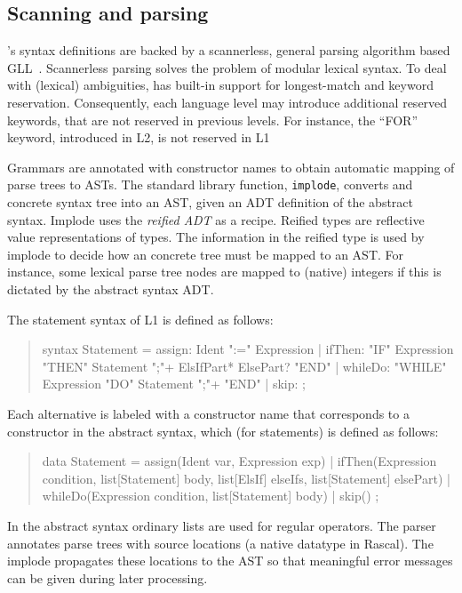 \subsection{Scanning and parsing}

\noindent \Rascal's syntax definitions are backed by a scannerless, general
parsing algorithm based GLL~\cite{JohnstoneScott11}. Scannerless
parsing solves the problem of modular lexical syntax. To deal with
(lexical) ambiguities, \Rascal has built-in support for longest-match
and keyword reservation. Consequently, each language level may
introduce additional reserved keywords, that are not reserved in
previous levels. For instance, the ``FOR'' keyword, introduced in L2,
is not reserved in L1

Grammars are annotated with constructor names to obtain automatic
mapping of parse trees to ASTs. The \Rascal standard library function,
\texttt{implode}, converts and concrete syntax tree into an AST, given
an ADT definition of the abstract syntax. Implode uses the
\textit{reified ADT} as a recipe. Reified types are reflective value
representations of \Rascal types. The information in the reified type
is used by implode to decide how an concrete tree must be mapped to an
AST. For instance, some lexical parse tree nodes are mapped to
(native) integers if this is dictated by the abstract syntax ADT.

The statement syntax of \oberon L1 is defined as follows:
\begin{quote}
\begin{rascal}
syntax Statement 
  = assign: Ident ":=" Expression
  | ifThen: "IF" Expression "THEN" 
               {Statement ";"}+  ElsIfPart* ElsePart? "END"
  | whileDo: "WHILE" Expression "DO" {Statement ";"}+ "END"
  | skip: ;
\end{rascal}
\end{quote}
Each alternative is labeled with a constructor name that corresponds
to a constructor in the abstract syntax, which (for statements) is
defined as follows:
\begin{quote}
\begin{rascal}
data Statement 
  = assign(Ident var, Expression exp)
  | ifThen(Expression condition, list[Statement] body, 
       list[ElsIf] elseIfs, list[Statement] elsePart)
  | whileDo(Expression condition, list[Statement] body)
  | skip()
  ;
\end{rascal}
\end{quote}
In the abstract syntax ordinary \Rascal lists are used for regular
operators.  The \Rascal parser annotates parse trees with source
locations (a native datatype in Rascal). The implode propagates these
locations to the AST so that meaningful error messages can be given
during later processing.

